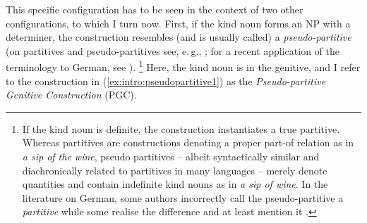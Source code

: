 \begin{exe}
  \ex\label{ex:intro:alternation}
  \begin{xlist}
  \end{xlist}
\end{exe}

This specific configuration has to be seen in the context of two other configurations, to which I turn now.
First, if the kind noun forms an NP with a determiner, the construction resembles (and is usually called) a \textit{pseudo-partitive} (on partitives and pseudo-partitives see, e.\,g., \citealp{Barker1998,Selkirk1977,Stickney2007,Vos1999}; for a recent application of the terminology to German, see \citealp{Gerstenberger2015}).%
\footnote{If the kind noun is definite, the construction instantiates a true partitive.
Whereas partitives are constructions denoting a proper part-of relation as in \textit{a sip of the wine}, pseudo partitives -- albeit syntactically similar and diachronically related to partitives in many languages -- merely denote quantities and contain indefinite kind nouns as in \textit{a sip of wine}.
In the literature on German, some authors incorrectly call the pseudo-partitive a \textit{partitive} \citep{Hentschel1993} while some realise the difference and at least mention it \citep{Eschenbach1994,GallmannLindauer1994,Loebel1989,Zimmer2015}.
}
Here, the kind noun is in the genitive, and I refer to the construction in (\ref{ex:intro:pseudopartitive1}) as the \textit{Pseudo-partitive Genitive Construction} (PGC).

\begin{exe}
\end{exe}

